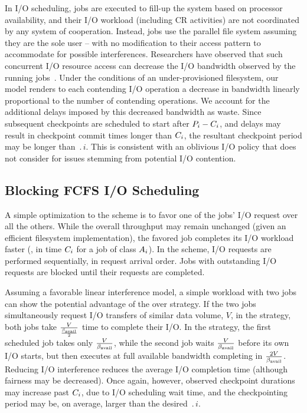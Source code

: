 In \nocoop I/O scheduling, jobs are executed to fill-up the system based on processor
availability, and their I/O workload (including CR activities) are not coordinated by
any system of cooperation.  Instead, jobs use the parallel file system
assuming they are the sole user -- with no modification to their access pattern to
accommodate for possible interferences. Researchers have observed that such
concurrent I/O resource access can decrease the I/O bandwidth observed by the running
jobs~\cite{Dorier2015}.  Under the conditions of an under-provisioned filesystem, our
model renders to each contending I/O operation a decrease in bandwidth linearly
proportional to the number of contending operations.  We account for the additional
delays imposed by this decreased bandwidth as waste. Since subsequent checkpoints are
scheduled to start after $P_{i}-C_{i}$, and delays may result in checkpoint
commit times longer than $C_{i}$, the resultant checkpoint period may be longer
than $\period{i}$. This is consistent with an oblivious I/O policy that does not
consider for issues stemming from potential I/O contention.


\subsection{Blocking \fifoblock FCFS I/O Scheduling}
\label{sec:fcfsblock}

A simple optimization to the \nocoop scheme is to favor one of the jobs' I/O request
over all the others. While the overall throughput may remain unchanged (given an
efficient filesystem implementation), the favored job completes its I/O
workload faster (\ie, in time $C_{i}$ for a job of class $A_{i}$).  In
the \fifoblock scheme, I/O requests are performed sequentially, in request arrival
order. Jobs with outstanding I/O requests are blocked until their requests are
completed.

Assuming a favorable linear interference model, a simple workload with two jobs can
show the potential advantage of the \fifoblock over \nocoop strategy.  If the two
jobs simultaneously request I/O transfers of similar data volume, $V$, in the \nocoop
strategy, both jobs take $\frac{V}{\frac{\beta_{\text{avail}}}{2}}$ time to complete their I/O.
In the \fifoblock strategy, the first scheduled job takes only
$\frac{V}{\beta_{\text{avail}}}$, while the second job waits $\frac{V}{\beta_{\text{avail}}}$
before its own I/O starts, but then executes at full available bandwidth completing
in $\frac{2V}{\beta_{\text{avail}}}$.  Reducing I/O interference reduces the average I/O
completion time (although fairness may be decreased).  Once again, however, observed
checkpoint durations may increase past $C_{i}$, due to I/O scheduling wait time,
and the checkpointing period may be, on average, larger than the desired
$\period{i}$.

